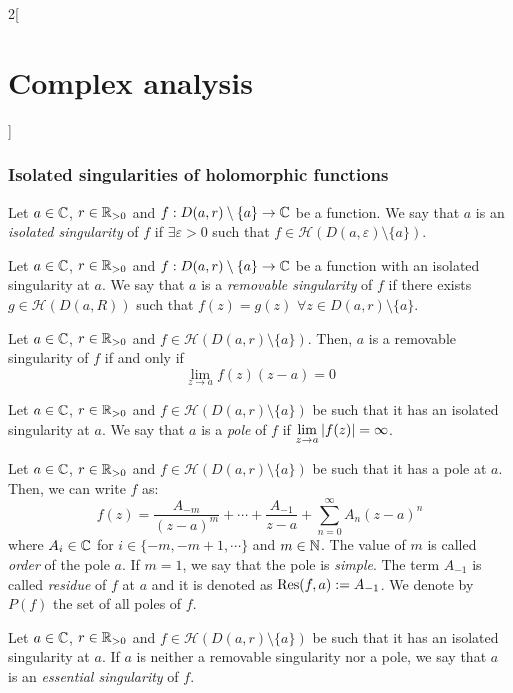 \documentclass[../../../main_math.tex]{subfiles}
\begin{document}
\begin{multicols}{2}[\section{Complex analysis}]
  \subsubsection{Isolated singularities of holomorphic functions}
  \begin{definition}
    Let $a\in\mathbb{C}$, $r\in\mathbb{R}_{>0}$ and $f:D(a,r)\setminus\{a\}\rightarrow\mathbb{C}$ be a function. We say that $a$ is an \emph{isolated singularity} of $f$ if $\exists \varepsilon>0$ such that $f\in\mathcal{H}(D(a,\varepsilon)\setminus\{a\})$.
  \end{definition}
  \begin{definition}
    Let $a\in\mathbb{C}$, $r\in\mathbb{R}_{>0}$ and $f:D(a,r)\setminus\{a\}\rightarrow\mathbb{C}$ be a function with an isolated singularity at $a$. We say that $a$ is a \emph{removable singularity} of $f$ if there exists $g\in \mathcal{H}(D(a,R))$ such that $f(z)=g(z)$ $\forall z\in D(a,r)\setminus\{a\}$.
  \end{definition}
  \begin{theorem}
    Let $a\in\mathbb{C}$, $r\in\mathbb{R}_{>0}$ and $f\in\mathcal{H}(D(a,r)\setminus\{a\})$. Then, $a$ is a removable singularity of $f$ if and only if $$\lim_{z\to a}f(z)(z-a)=0$$
  \end{theorem}
  \begin{definition}
    Let $a\in\mathbb{C}$, $r\in\mathbb{R}_{>0}$ and $f\in\mathcal{H}(D(a,r)\setminus\{a\})$ be such that it has an isolated singularity at $a$. We say that $a$ is a \emph{pole} of $f$ if $\displaystyle\lim_{z\to a}\abs{f(z)}=\infty$.
  \end{definition}
  \begin{proposition}[Pole]
    Let $a\in\mathbb{C}$, $r\in\mathbb{R}_{>0}$ and $f\in\mathcal{H}(D(a,r)\setminus\{a\})$ be such that it has a pole at $a$. Then, we can write $f$ as: $$f(z)=\frac{A_{-m}}{{(z-a)}^m}+\cdots+\frac{A_{-1}}{z-a}+\sum_{n=0}^\infty A_n{(z-a)}^n$$ where $A_i\in\mathbb{C}$ for $i\in\{-m,-m+1,\cdots\}$ and $m\in\mathbb{N}$. The value of $m$ is called \emph{order} of the pole $a$. If $m=1$, we say that the pole is \emph{simple}. The term $A_{-1}$ is called \emph{residue} of $f$ at $a$ and it is denoted as $\Res(f,a):=A_{-1}$. We denote by $P(f)$ the set of all poles of $f$.
  \end{proposition}
  \begin{definition}
    Let $a\in\mathbb{C}$, $r\in\mathbb{R}_{>0}$ and $f\in\mathcal{H}(D(a,r)\setminus\{a\})$ be such that it has an isolated singularity at $a$. If $a$ is neither a removable singularity nor a pole, we say that $a$ is an \emph{essential singularity} of $f$.

\end{definition}
\end{multicols}
\end{document}
